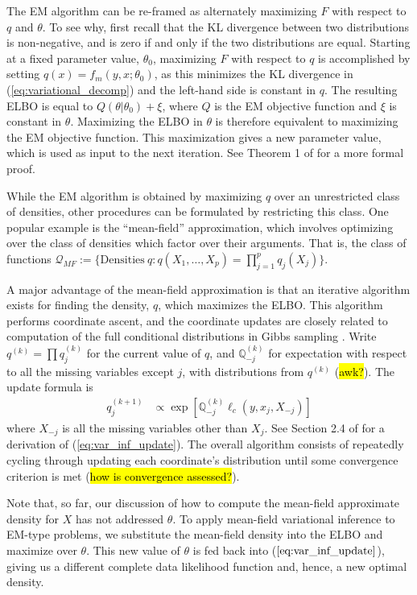 \documentclass[11pt, oneside]{article}   	%
\newcommand{\bQ}{\mathbb{Q}}
\begin{document}
The EM algorithm can be re-framed as alternately maximizing $F$ with respect to $q$ and $\theta$. To see why, first recall that the KL divergence between two distributions is non-negative, and is zero if and only if the two distributions are equal. Starting at a fixed parameter value, $\theta_0$, maximizing $F$ with respect to $q$ is accomplished by setting $q(x) = f_m(y, x; \theta_0)$, as this minimizes the KL divergence in (\ref{eq:variational_decomp}) and the left-hand side is constant in $q$. The resulting ELBO is equal to $Q(\theta|\theta_0) + \xi$, where $Q$ is the EM objective function and $\xi$ is constant in $\theta$. Maximizing the ELBO in $\theta$ is therefore equivalent to maximizing the EM objective function. This maximization gives a new parameter value, which is used as input to the next iteration. See Theorem 1 of \citet{Nea98} for a more formal proof.

While the EM algorithm is obtained by maximizing $q$ over an unrestricted class of densities, other procedures can be formulated by restricting this class. One popular example is the ``mean-field'' approximation, which involves optimizing over the class of densities which factor over their arguments. That is, the class of functions $\mathcal{Q}_{MF}:=\{ \mathrm{Densities\ } q: q(X_1, \ldots, X_p) = \prod_{j=1}^p q_j(X_j) \}$. 

A major advantage of the mean-field approximation is that an iterative algorithm exists for finding the density, $q$, which maximizes the ELBO. This algorithm performs coordinate ascent, and the coordinate updates are closely related to computation of the full conditional distributions in Gibbs sampling \citep{need}. Write $q^{(k)} = \prod q_j^{(k)}$ for the current value of $q$, and $\bQ^{(k)}_{-j}$ for expectation with respect to all the missing variables except $j$, with distributions from $q^{(k)}$ (\hl{awk?}). The update formula is
%
\begin{align}
    q_j^{(k+1)} &\propto \exp \left[ \bQ^{(k)}_{-j} \ell_c(y, x_j, X_{-j}) \right] \label{eq:var_inf_update}
\end{align}
%
where $X_{-j}$ is all the missing variables other than $X_j$. See Section 2.4 of \citet{Ble17} for a derivation of (\ref{eq:var_inf_update}). The overall algorithm consists of repeatedly cycling through updating each coordinate's distribution until some convergence criterion is met (\hl{how is convergence assessed?}).

Note that, so far, our discussion of how to compute the mean-field approximate density for $X$ has not addressed $\theta$. To apply mean-field variational inference to EM-type problems, we substitute the mean-field density into the ELBO and maximize over $\theta$. This new value of $\theta$ is fed back into ($\ref{eq:var_inf_update}$), giving us a different complete data likelihood function and, hence, a new optimal density.
\end{document}
